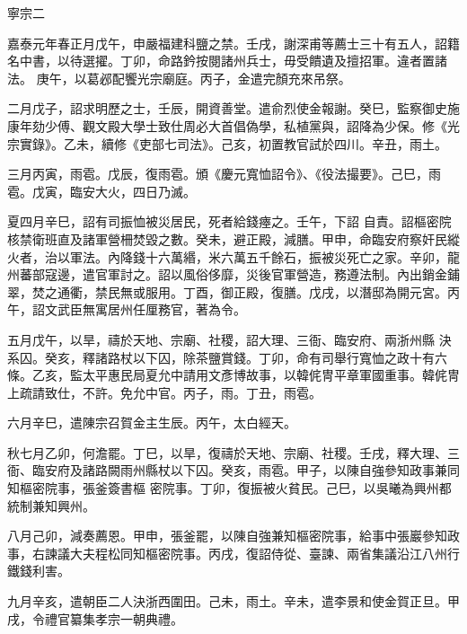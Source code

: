 
\begin{pinyinscope}

 寧宗二



 嘉泰元年春正月戊午，申嚴福建科鹽之禁。壬戌，謝深甫等薦士三十有五人，詔籍名中書，以待選擢。丁卯，命路鈐按閱諸州兵士，毋受饋遺及擅招軍。違者置諸法。
 庚午，以葛邲配饗光宗廟庭。丙子，金遣完顏充來吊祭。



 二月戊子，詔求明歷之士，壬辰，開資善堂。遣俞烈使金報謝。癸巳，監察御史施康年劾少傅、觀文殿大學士致仕周必大首倡偽學，私植黨與，詔降為少保。修《光宗實錄》。乙未，續修《吏部七司法》。己亥，初置教官試於四川。辛丑，雨土。



 三月丙寅，雨雹。戊辰，復雨雹。頒《慶元寬恤詔令》、《役法撮要》。己巳，雨雹。戊寅，臨安大火，四日乃滅。



 夏四月辛巳，詔有司振恤被災居民，死者給錢瘞之。壬午，下詔
 自責。詔樞密院核禁衛班直及諸軍營柵焚毀之數。癸未，避正殿，減膳。甲申，命臨安府察奸民縱火者，治以軍法。內降錢十六萬緡，米六萬五千餘石，振被災死亡之家。辛卯，龍州蕃部寇邊，遣官軍討之。詔以風俗侈靡，災後官軍營造，務遵法制。內出銷金鋪翠，焚之通衢，禁民無或服用。丁酉，御正殿，復膳。戊戌，以潛邸為開元宮。丙午，詔文武臣無寓居州任厘務官，著為令。



 五月戊午，以旱，禱於天地、宗廟、社稷，詔大理、三衙、臨安府、兩浙州縣
 決系囚。癸亥，釋諸路杖以下囚，除茶鹽賞錢。丁卯，命有司舉行寬恤之政十有六條。乙亥，監太平惠民局夏允中請用文彥博故事，以韓侂冑平章軍國重事。韓侂冑上疏請致仕，不許。免允中官。丙子，雨。丁丑，雨雹。



 六月辛巳，遣陳宗召賀金主生辰。丙午，太白經天。



 秋七月乙卯，何澹罷。丁巳，以旱，復禱於天地、宗廟、社稷。壬戌，釋大理、三衙、臨安府及諸路闕雨州縣杖以下囚。癸亥，雨雹。甲子，以陳自強參知政事兼同知樞密院事，張釜簽書樞
 密院事。丁卯，復振被火貧民。己巳，以吳曦為興州都統制兼知興州。



 八月己卯，減奏薦恩。甲申，張釜罷，以陳自強兼知樞密院事，給事中張巖參知政事，右諫議大夫程松同知樞密院事。丙戌，復詔侍從、臺諫、兩省集議沿江八州行鐵錢利害。



 九月辛亥，遣朝臣二人決浙西圍田。己未，雨土。辛未，遣李景和使金賀正旦。甲戌，令禮官纂集孝宗一朝典禮。




\end{pinyinscope}

